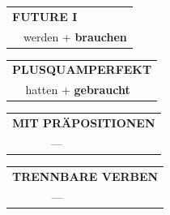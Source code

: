 \documentclass[10pt,a4paper]{revtex4-2}
\begin{document}
\begin{verbbox-acc}
\begin{tabular}{rl}
    \multicolumn{2}{l}{\textbf{FUTURE I} }\\
  &  werden + \textbf{brauchen}\\
 
  \end{tabular}
\hfill
   \begin{tabular}{rl}
      \multicolumn{2}{l}{\textbf{PLUSQUAMPERFEKT}}\\
  &  hatten + \textbf{gebraucht}\\
  \end{tabular}
  
  \vspace{10pt}

\begin{tabular}{lll}
\multicolumn{3}{l}{\textbf{MIT PRÄPOSITIONEN}}\\
& ---\\
\end{tabular}
\hfill
\begin{tabular}{lll}
\multicolumn{3}{l}{\textbf{TRENNBARE VERBEN}}\\
& ---\\
\end{tabular}

  \vspace{-5pt}


\end{verbbox-acc}
\end{document}
